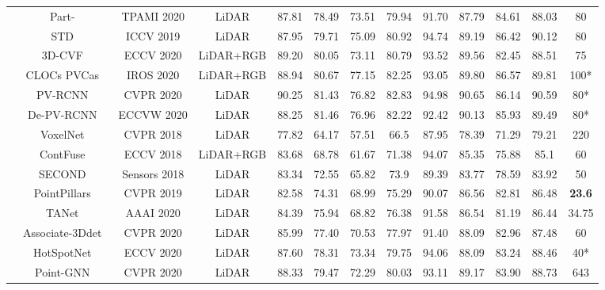 \documentclass[letterpaper]{article}
\begin{document}
\begin{table*}[t]
\begin{tabular}{c|c|c|c|cccc|cccc|c}
         & Part-~\cite{shi2020points}   &TPAMI 2020   & {LiDAR}     & 87.81  & 78.49  & 73.51 &79.94 &91.70  &87.79  &84.61  &88.03 & 80\\
& STD~\cite{yang2019std}            &ICCV 2019   & {LiDAR}     & 87.95  & 79.71  & 75.09 &80.92 &94.74 &89.19 &86.42 & 90.12 & 80\\
         & 3D-CVF~\cite{yoo20203d}           &ECCV 2020   & {LiDAR+RGB}   & 89.20  & 80.05  & 73.11 &80.79 &93.52  &89.56 &82.45  &88.51 & 75\\
         & CLOCs PVCas~\cite{pang2020clocs}  &IROS 2020   & {LiDAR+RGB}     & 88.94  & 80.67  &77.15 &82.25  &93.05  &89.80  &86.57  &89.81 &100*\\
         & PV-RCNN~\cite{shi2020pv}          &CVPR 2020   & {LiDAR}     & 90.25  & 81.43  & 76.82 & 82.83 &94.98  &90.65  &86.14  &90.59 & 80*\\
         & De-PV-RCNN~\cite{2020deformable} &ECCVW 2020   & {LiDAR}     & 88.25  & 81.46  & 76.96 &82.22 &92.42  &90.13  &85.93  &89.49 & 80*\\
      \hline
      \hline
         \parbox[t]{2mm}{}
& VoxelNet~\cite{zhou2018voxelnet} &CVPR 2018   &{LiDAR}      & 77.82  & 64.17  & 57.51 &66.5 &87.95 &78.39 &71.29 &79.21 & 220\\
         & ContFuse~\cite{CONTFUSE}         &ECCV 2018   &{LiDAR+RGB}    & 83.68  & 68.78  & 61.67 &71.38 &94.07 &85.35 &75.88 & 85.1 & 60\\
         & SECOND~\cite{yan2018second}      &Sensors 2018   &{LiDAR}      & 83.34  & 72.55  & 65.82 &73.9 &89.39 &83.77 &78.59 &83.92 & 50\\
         & PointPillars~\cite{lang2019pointpillars}&CVPR 2019   &{LiDAR}      & 82.58  & 74.31  & 68.99 &75.29 &90.07 &86.56 &82.81 &86.48 & \bf 23.6\\
         & TANet~\cite{liu2020tanet}        &AAAI 2020   &{LiDAR}      & 84.39  & 75.94  & 68.82 &76.38 &91.58  &86.54  &81.19  &86.44 & 34.75\\
         & Associate-3Ddet~\cite{du2020associate}&CVPR 2020   &{LiDAR}      & 85.99  & 77.40  & 70.53 &77.97 &91.40  &88.09  &82.96  &87.48 & 60\\
         & HotSpotNet~\cite{chen2019object}  &ECCV 2020   & {LiDAR}      &87.60 &78.31 &73.34 &79.75 &94.06 &88.09 &83.24 & 88.46 & 40*\\
         & Point-GNN~\cite{shi2020point}    &CVPR 2020   &{LiDAR}      & 88.33  & 79.47  & 72.29 &80.03 &93.11  &89.17  &83.90  &88.73 & 643\\

\end{tabular}
\end{table*}
\end{document}
